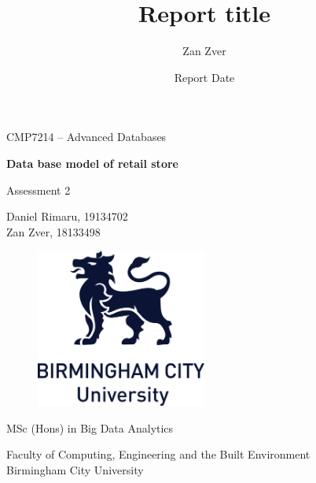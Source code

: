 \documentclass[12pt]{article}
\title{Report title}
\author{Zan Zver}
\date{Report Date }
\newcommand{\authorNameD}{Daniel Rimaru}
\newcommand{\authorIDD}{19134702}
\newcommand{\authorNameZ}{Zan Zver}
\newcommand{\authorIDZ}{18133498}
\newcommand{\reportTitle}{Data base model of retail store}
\newcommand{\degreeAward}{MSc (Hons) in Big Data Analytics}
\begin{document}
%
\begin{titlepage}
    \begin{center}
        CMP7214 – Advanced Databases
        \vspace*{0.5cm}
 
        \huge\textbf{\reportTitle} 
 
        \vspace{0.5cm}
            Assessment 2
        \vspace{1.5cm}

        \authorNameD, \authorIDD \\
        \authorNameZ, \authorIDZ
 
        \vfill
             
        \vspace{0.8cm}
      
        \begin{figure}[htp]
         \centering
         \includegraphics[width=0.5\textwidth]{logo}
        \end{figure}
        
        \large{\degreeAward}
        
        \large{Faculty of Computing, Engineering and the Built Environment \\
        Birmingham City University \\}
             
    \end{center}
\end{titlepage}

\pagestyle{fancy}
\fancyhf{}
\setlength{\headsep}{50pt}
\end{document}
